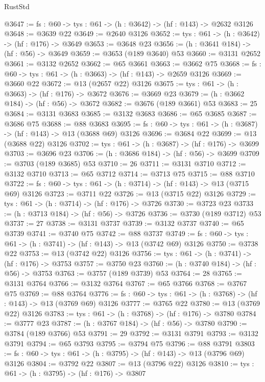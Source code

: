 \begin{lexlean}{RustStd}
\begin{coremodule}
@3647 := {fs : @60} -> {tys : @61} -> (h : @3642) -> (hf : @143) -> @2632 @3126
@3648 := @3639 @22
@3649 := @2640 @3126
@3652 := {tys : @61} -> (h : @3642) -> (hf : @176) -> @3649
@3653 := @3648 @23
@3656 := (h : @3641 @184) -> (hf : @56) -> @3649
@3659 := @3653 (@189 @3640) @53
@3660 := @3131 @2652
@3661 := @3132 @2652
@3662 := @65 @3661
@3663 := @3662 @75
@3668 := {fs : @60} -> {tys : @61} -> (h : @3663) -> (hf : @143) -> @2659 @3126
@3669 := @3660 @22
@3672 := @13 (@2657 @22) @3126
@3675 := {tys : @61} -> (h : @3663) -> (hf : @176) -> @3672
@3676 := @3669 @23
@3679 := (h : @3662 @184) -> (hf : @56) -> @3672
@3682 := @3676 (@189 @3661) @53
@3683 := 25
@3684 := @3131 @3683
@3685 := @3132 @3683
@3686 := @65 @3685
@3687 := @3686 @75
@3688 := @88 @3683
@3695 := {fs : @60} -> {tys : @61} -> (h : @3687) -> (hf : @143) -> @13 (@3688 @69) @3126
@3696 := @3684 @22
@3699 := @13 (@3688 @22) @3126
@3702 := {tys : @61} -> (h : @3687) -> (hf : @176) -> @3699
@3703 := @3696 @23
@3706 := (h : @3686 @184) -> (hf : @56) -> @3699
@3709 := @3703 (@189 @3685) @53
@3710 := 26
@3711 := @3131 @3710
@3712 := @3132 @3710
@3713 := @65 @3712
@3714 := @3713 @75
@3715 := @88 @3710
@3722 := {fs : @60} -> {tys : @61} -> (h : @3714) -> (hf : @143) -> @13 (@3715 @69) @3126
@3723 := @3711 @22
@3726 := @13 (@3715 @22) @3126
@3729 := {tys : @61} -> (h : @3714) -> (hf : @176) -> @3726
@3730 := @3723 @23
@3733 := (h : @3713 @184) -> (hf : @56) -> @3726
@3736 := @3730 (@189 @3712) @53
@3737 := 27
@3738 := @3131 @3737
@3739 := @3132 @3737
@3740 := @65 @3739
@3741 := @3740 @75
@3742 := @88 @3737
@3749 := {fs : @60} -> {tys : @61} -> (h : @3741) -> (hf : @143) -> @13 (@3742 @69) @3126
@3750 := @3738 @22
@3753 := @13 (@3742 @22) @3126
@3756 := {tys : @61} -> (h : @3741) -> (hf : @176) -> @3753
@3757 := @3750 @23
@3760 := (h : @3740 @184) -> (hf : @56) -> @3753
@3763 := @3757 (@189 @3739) @53
@3764 := 28
@3765 := @3131 @3764
@3766 := @3132 @3764
@3767 := @65 @3766
@3768 := @3767 @75
@3769 := @88 @3764
@3776 := {fs : @60} -> {tys : @61} -> (h : @3768) -> (hf : @143) -> @13 (@3769 @69) @3126
@3777 := @3765 @22
@3780 := @13 (@3769 @22) @3126
@3783 := {tys : @61} -> (h : @3768) -> (hf : @176) -> @3780
@3784 := @3777 @23
@3787 := (h : @3767 @184) -> (hf : @56) -> @3780
@3790 := @3784 (@189 @3766) @53
@3791 := 29
@3792 := @3131 @3791
@3793 := @3132 @3791
@3794 := @65 @3793
@3795 := @3794 @75
@3796 := @88 @3791
@3803 := {fs : @60} -> {tys : @61} -> (h : @3795) -> (hf : @143) -> @13 (@3796 @69) @3126
@3804 := @3792 @22
@3807 := @13 (@3796 @22) @3126
@3810 := {tys : @61} -> (h : @3795) -> (hf : @176) -> @3807

\end{coremodule}
\end{lexlean}

